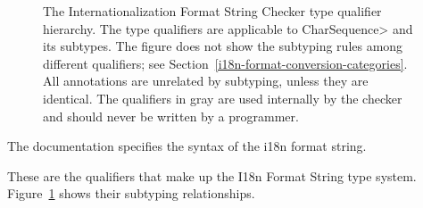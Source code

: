 \begin{figure}
\caption{The
  Internationalization
  Format String Checker type qualifier hierarchy.
  The type qualifiers are applicable to \<CharSequence> and its subtypes.
  The figure does not show the subtyping rules among different
  qualifiers; see
  Section~\ref{i18n-format-conversion-categories}.
  All  annotations
  are unrelated by subtyping, unless they are identical.
  The qualifiers in gray are used internally by
  the checker and should never be written by a programmer.
}
\label{i18n-format-type-hierarchy}
\end{figure}

The  documentation
specifies the syntax of the i18n format string.

These are the qualifiers that make up the I18n Format String type system.
Figure~\ref{i18n-format-type-hierarchy} shows their subtyping relationships.

